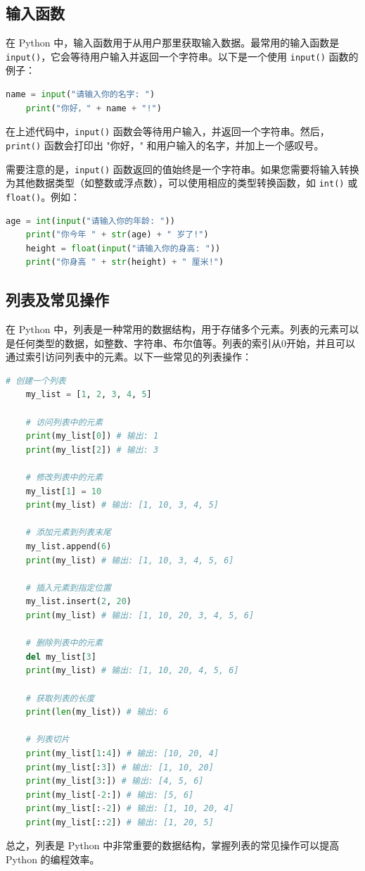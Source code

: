 \subsection{输入函数}
在 Python 中，输入函数用于从用户那里获取输入数据。最常用的输入函数是 \texttt{input()}，它会等待用户输入并返回一个字符串。以下是一个使用 \texttt{input()} 函数的例子：
\begin{lstlisting}[language=Python]
    name = input("请输入你的名字: ")
    print("你好，" + name + "!")
\end{lstlisting}
在上述代码中，\texttt{input()} 函数会等待用户输入，并返回一个字符串。然后，\texttt{print()} 函数会打印出 "你好，" 和用户输入的名字，并加上一个感叹号。
\par
需要注意的是，\texttt{input()} 函数返回的值始终是一个字符串。如果您需要将输入转换为其他数据类型（如整数或浮点数），可以使用相应的类型转换函数，如 \texttt{int()} 或 \texttt{float()}。例如：
\begin{lstlisting}[language=Python]    
    age = int(input("请输入你的年龄: "))
    print("你今年 " + str(age) + " 岁了!")
    height = float(input("请输入你的身高: "))
    print("你身高 " + str(height) + " 厘米!")
\end{lstlisting}



\subsection{列表及常见操作}
在 Python 中，列表是一种常用的数据结构，用于存储多个元素。列表的元素可以是任何类型的数据，如整数、字符串、布尔值等。列表的索引从0开始，并且可以通过索引访问列表中的元素。以下一些常见的列表操作：
\begin{lstlisting}[language=Python]
    # 创建一个列表
    my_list = [1, 2, 3, 4, 5]
    
    # 访问列表中的元素
    print(my_list[0]) # 输出: 1
    print(my_list[2]) # 输出: 3
    
    # 修改列表中的元素
    my_list[1] = 10
    print(my_list) # 输出: [1, 10, 3, 4, 5]
    
    # 添加元素到列表末尾
    my_list.append(6)
    print(my_list) # 输出: [1, 10, 3, 4, 5, 6]
    
    # 插入元素到指定位置
    my_list.insert(2, 20)
    print(my_list) # 输出: [1, 10, 20, 3, 4, 5, 6]
    
    # 删除列表中的元素
    del my_list[3]
    print(my_list) # 输出: [1, 10, 20, 4, 5, 6]
    
    # 获取列表的长度
    print(len(my_list)) # 输出: 6
    
    # 列表切片
    print(my_list[1:4]) # 输出: [10, 20, 4]
    print(my_list[:3]) # 输出: [1, 10, 20]
    print(my_list[3:]) # 输出: [4, 5, 6]
    print(my_list[-2:]) # 输出: [5, 6]
    print(my_list[:-2]) # 输出: [1, 10, 20, 4]
    print(my_list[::2]) # 输出: [1, 20, 5]
\end{lstlisting}
总之，列表是 Python 中非常重要的数据结构，掌握列表的常见操作可以提高 Python 的编程效率。


